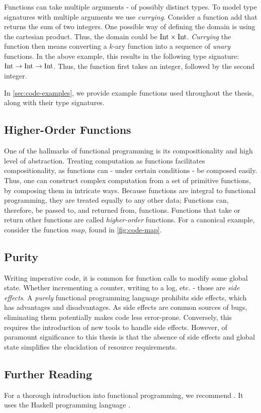 Functions can take multiple arguments - of possibly distinct types. To model type signatures with multiple arguments we use \emph{currying}. Consider a function add that returns the sum of two integers. One possible way of defining the domain is using the cartesian product. Thus, the domain could be \(\text{Int} \times \text{Int}\). \emph{Currying} the function then means converting a \(k\)-ary function into a sequence of \emph{unary} functions. In the above example, this results in the following type signature: \(\text{Int} \to \text{Int} \to \text{Int}\). Thus, the function first takes an integer, followed by the second integer. 


In \cref{sec:code-examples}, we provide example functions used throughout the thesis, along with their type signatures.

\subsection{Higher-Order Functions}

One of the hallmarks of functional programming is its compositionality and high level of abstraction. Treating computation as functions facilitates compositionality, as functions can - under certain conditions - be composed easily. Thus, one can construct complex computation from a set of primitive functions, by composing them in intricate ways. Because functions are integral to functional programming, they are treated equally to any other data; Functions can, therefore, be passed to, and returned from, functions. Functions that take or return other functions are called \emph{higher-order} functions. For a canonical example, consider the function \(map\), found in \cref{fig:code-map}.


\subsection{Purity}

Writing imperative code, it is common for function calls to modify some global state. Whether incrementing a counter, writing to a log, etc. - those are \emph{side effects}. A \emph{purely} functional programming language prohibits side effects, which has advantages and disadvantages. As side effects are common sources of bugs, eliminating them potentially makes code less error-prone. Conversely, this requires the introduction of new tools to handle side effects. However, of paramount significance to this thesis is that the absence of side effects and global state simplifies the elucidation of resource requirements. 

\subsection{Further Reading}

For a thorough introduction into functional programming, we recommend \cite{allenHaskellProgrammingFirst2016}. It uses the Haskell programming language \cite{HaskellLanguage}.
